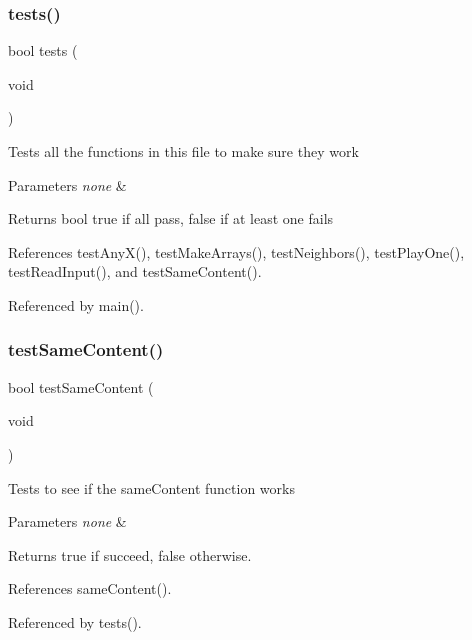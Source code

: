 \subsubsection{tests()}
{\footnotesize\ttfamily bool tests (\begin{DoxyParamCaption}\item[{void}]{ }\end{DoxyParamCaption})}

Tests all the functions in this file to make sure they work 
\begin{DoxyParams}{Parameters}
{\em none} & \\
\hline
\end{DoxyParams}
\begin{DoxyReturn}{Returns}
bool true if all pass, false if at least one fails 
\end{DoxyReturn}


References test\+Any\+X(), test\+Make\+Arrays(), test\+Neighbors(), test\+Play\+One(), test\+Read\+Input(), and test\+Same\+Content().



Referenced by main().

\mbox{\label{tests_8c_a7017056d6783f53023d1f1f0336d3d3e}} 
\subsubsection{test\+Same\+Content()}
{\footnotesize\ttfamily bool test\+Same\+Content (\begin{DoxyParamCaption}\item[{void}]{ }\end{DoxyParamCaption})}

Tests to see if the same\+Content function works 
\begin{DoxyParams}{Parameters}
{\em none} & \\
\hline
\end{DoxyParams}
\begin{DoxyReturn}{Returns}
true if succeed, false otherwise. 
\end{DoxyReturn}


References same\+Content().



Referenced by tests().


